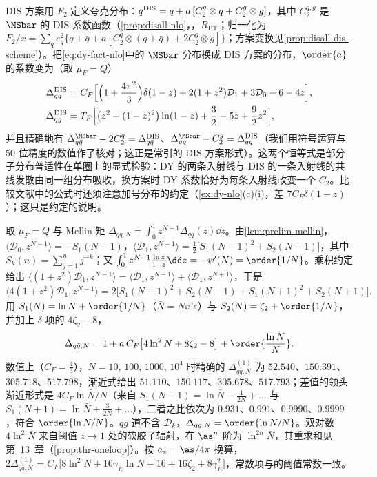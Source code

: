 \begin{remark}\label{rem:dy-dis-scheme}
DIS 方案用 $F_2$ 定义夸克分布：$q^{\rm DIS}=q+a\,[C_2^q\otimes q+C_2^g\otimes g]$，其中 $C_2^{q,g}$ 是 $\MSbar$ 的 DIS 系数函数（\cref{prop:disall-nlo}，\tagR，$R_{\mathrm{PT}}$；归一化为 $F_2/x=\sum_qe_q^2\{q+\bar q+a[C_2^q\otimes(q+\bar q)+2C_2^g\otimes g]\}$；方案变换见\cref{prop:disall-dis-scheme}）。把\cref{eq:dy-fact-nlo}中的 $\MSbar$ 分布换成 DIS 方案的分布，$\order{a}$ 的系数变为（取 $\mu_F=Q$）
\[
\begin{aligned}
\Delta^{\rm DIS}_{q\bar q}&=C_F\Big[\Big(1+\frac{4\pi^2}3\Big)\delta(1-z)+2(1+z^2)\mathcal D_1+3\mathcal D_0-6-4z\Big],\\
\Delta^{\rm DIS}_{qg}&=T_F\Big[\big(z^2+(1-z)^2\big)\ln(1-z)+\frac32-5z+\frac92z^2\Big],
\end{aligned}
\]
并且精确地有 $\Delta^{\MSbar}_{q\bar q}-2C_2^q=\Delta^{\rm DIS}_{q\bar q}$、$\Delta^{\MSbar}_{qg}-C_2^g=\Delta^{\rm DIS}_{qg}$（我们用符号运算与 50 位精度的数值作了核对；这正是常引的 DIS 方案形式）。这两个恒等式是部分子分布普适性在单圈上的显式检验：DY 的两条入射线与 DIS 的一条入射线的共线发散由同一组分布吸收，换方案时 DY 系数恰好为每条入射线改变一个 $C_2$。比较文献中的公式时还须注意加号分布的约定（\cref{ex:dy-nlo}(c)(i)，差 $7C_F\delta(1-z)$）；这只是约定的说明。
\end{remark}

\begin{example}[大 $N$ 极限]\label{ex:dy-threshold}
取 $\mu_F=Q$ 与 Mellin 矩 $\Delta_{q\bar q,N}=\int_0^1z^{N-1}\Delta_{q\bar q}(z)\dd z$。由\cref{lem:prelim-mellin}，$\langle\mathcal D_0,z^{N-1}\rangle=-S_1(N-1)$，$\langle\mathcal D_1,z^{N-1}\rangle=\frac12\big[S_1(N-1)^2+S_2(N-1)\big]$，其中 $S_k(n)=\sum_{j=1}^nj^{-k}$；又 $\int_0^1z^{N-1}\frac{\ln z}{1-z}\dd z=-\psi'(N)=\order{1/N}$。乘积约定给出 $\langle(1+z^2)\mathcal D_1,z^{N-1}\rangle=\langle\mathcal D_1,z^{N-1}\rangle+\langle\mathcal D_1,z^{N+1}\rangle$，于是
\[
\langle4(1+z^2)\mathcal D_1,z^{N-1}\rangle=2\big[S_1(N-1)^2+S_2(N-1)+S_1(N+1)^2+S_2(N+1)\big].
\]
用 $S_1(N)=\ln\bar N+\order{1/N}$（$\bar N=N\ee^{\gamma_E}$）与 $S_2(N)=\zeta_2+\order{1/N}$，并加上 $\delta$ 项的 $4\zeta_2-8$，
\[
\Delta_{q\bar q,N}=1+a\,C_F\big[4\ln^2\bar N+8\zeta_2-8\big]+\order{\frac{\ln N}{N}} .
\]
数值上（$C_F=\frac43$），$N=10,\,100,\,1000,\,10^4$ 时精确的 $\Delta^{(1)}_{q\bar q,N}$ 为 $52.540$、$150.391$、$305.718$、$517.798$，渐近式给出 $51.110$、$150.117$、$305.678$、$517.793$；差值的领头渐近形式是 $4C_F\ln\bar N/N$（来自 $S_1(N-1)=\ln\bar N-\frac1{2N}+\dots$ 与 $S_1(N+1)=\ln\bar N+\frac3{2N}+\dots$），二者之比依次为 $0.931$、$0.991$、$0.9990$、$0.9999$，符合 $\order{\ln N/N}$。$qg$ 道不含 $\mathcal D_k$，$\Delta_{qg,N}=\order{\ln N/N}$。双对数 $4\ln^2\bar N$ 来自阈值 $z\to1$ 处的软胶子辐射，在 $\as^n$ 阶为 $\ln^{2n}\bar N$，其重求和见第~13~章（\cref{prop:thr-oneloop}）。按 $a_s=\as/4\pi$ 换算，$2\Delta^{(1)}_{q\bar q,N}=C_F\big[8\ln^2N+16\gamma_E\ln N-16+16\zeta_2+8\gamma_E^2\big]$，常数项与\cite{Moch:2005ky}的阈值常数一致。
\end{example}
